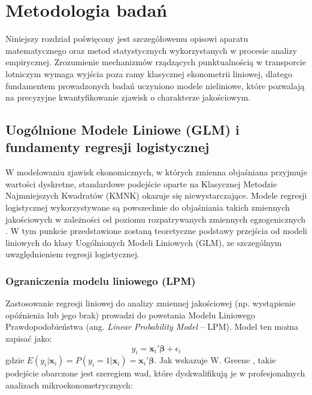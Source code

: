 \chapter{Metodologia badań}

Niniejszy rozdział poświęcony jest szczegółowemu opisowi aparatu matematycznego oraz metod statystycznych wykorzystanych w procesie analizy empirycznej. Zrozumienie mechanizmów rządzących punktualnością w transporcie lotniczym wymaga wyjścia poza ramy klasycznej ekonometrii liniowej, dlatego fundamentem prowadzonych badań uczyniono modele nieliniowe, które pozwalają na precyzyjne kwantyfikowanie zjawisk o charakterze jakościowym.

\section{Uogólnione Modele Liniowe (GLM) i fundamenty regresji logistycznej}

W modelowaniu zjawisk ekonomicznych, w których zmienna objaśniana przyjmuje wartości dyskretne, standardowe podejście oparte na Klasycznej Metodzie Najmniejszych Kwadratów (KMNK) okazuje się niewystarczające. Modele regresji logistycznej wykorzystywane są powszechnie do objaśniania takich zmiennych jakościowych w zależności od poziomu rozpatrywanych zmiennych egzogenicznych \cite{jackowska2011}. W tym punkcie przedstawione zostaną teoretyczne podstawy przejścia od modeli liniowych do klasy Uogólnionych Modeli Liniowych (GLM), ze szczególnym uwzględnieniem regresji logistycznej.

\subsection{Ograniczenia modelu liniowego (LPM)}

Zastosowanie regresji liniowej do analizy zmiennej jakościowej (np. wystąpienie opóźnienia lub jego brak) prowadzi do powstania Modelu Liniowego Prawdopodobieństwa (ang. \textit{Linear Probability Model} -- LPM). Model ten można zapisać jako:
\begin{equation}
    y_i = \mathbf{x}_i' \boldsymbol{\beta} + \epsilon_i
\end{equation}
gdzie $E(y_i | \mathbf{x}_i) = P(y_i = 1 | \mathbf{x}_i) = \mathbf{x}_i' \boldsymbol{\beta}$. Jak wskazuje W. Greene \cite{greene2003}, takie podejście obarczone jest szeregiem wad, które dyskwalifikują je w profesjonalnych analizach mikroekonometrycznych:


